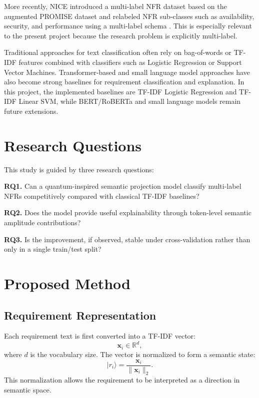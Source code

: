 \documentclass[conference]{IEEEtran}
\begin{document}
More recently, NICE introduced a multi-label NFR dataset based on the augmented PROMISE dataset and relabeled NFR sub-classes such as availability, security, and performance using a multi-label schema \cite{nice_dataset}. This is especially relevant to the present project because the research problem is explicitly multi-label.

Traditional approaches for text classification often rely on bag-of-words or TF-IDF features combined with classifiers such as Logistic Regression or Support Vector Machines. Transformer-based and small language model approaches have also become strong baselines for requirement classification and explanation. In this project, the implemented baselines are TF-IDF Logistic Regression and TF-IDF Linear SVM, while BERT/RoBERTa and small language models remain future extensions.

\section{Research Questions}
This study is guided by three research questions:

\textbf{RQ1.} Can a quantum-inspired semantic projection model classify multi-label NFRs competitively compared with classical TF-IDF baselines?

\textbf{RQ2.} Does the model provide useful explainability through token-level semantic amplitude contributions?

\textbf{RQ3.} Is the improvement, if observed, stable under cross-validation rather than only in a single train/test split?

\section{Proposed Method}
\subsection{Requirement Representation}
Each requirement text is first converted into a TF-IDF vector:
\begin{equation}
    \mathbf{x}_i \in \mathbb{R}^{d},
\end{equation}
where $d$ is the vocabulary size. The vector is normalized to form a semantic state:
\begin{equation}
    \lvert r_i \rangle = \frac{\mathbf{x}_i}{\lVert \mathbf{x}_i \rVert_2}.
\end{equation}
This normalization allows the requirement to be interpreted as a direction in semantic space.
\end{document}
